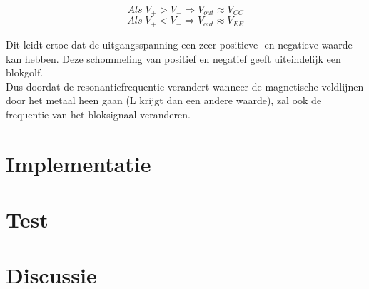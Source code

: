\documentclass{report}
\begin{document}
\begin{equation}
Als \;V_+>V_- \Rightarrow V_{out}\approx V_{CC}
\end{equation}
\begin{equation}
Als \; V_+<V_- \Rightarrow V_{out}\approx V_{EE}
\end{equation}

Dit leidt ertoe dat de uitgangsspanning een zeer positieve- en negatieve waarde kan hebben. Deze schommeling van positief en negatief geeft uiteindelijk een blokgolf.\\

Dus doordat de resonantiefrequentie verandert wanneer de magnetische veldlijnen door het metaal heen gaan (L krijgt dan een andere waarde), zal ook de frequentie van het bloksignaal veranderen. 

\section{Implementatie}

\section{Test}

\section{Discussie}
\end{document}
